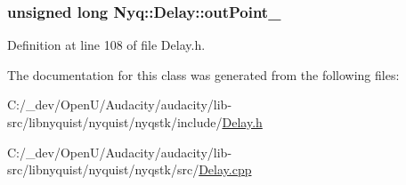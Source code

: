 \subsubsection[{\texorpdfstring{out\+Point\+\_\+}{outPoint_}}]{\setlength{\rightskip}{0pt plus 5cm}unsigned long Nyq\+::\+Delay\+::out\+Point\+\_\+\hspace{0.3cm}{\ttfamily [protected]}}\hypertarget{class_nyq_1_1_delay_a978ec66eae70e6da71854411421fe857}{}\label{class_nyq_1_1_delay_a978ec66eae70e6da71854411421fe857}


Definition at line 108 of file Delay.\+h.



The documentation for this class was generated from the following files\+:\begin{DoxyCompactItemize}
\item 
C\+:/\+\_\+dev/\+Open\+U/\+Audacity/audacity/lib-\/src/libnyquist/nyquist/nyqstk/include/\hyperlink{_delay_8h}{Delay.\+h}\item 
C\+:/\+\_\+dev/\+Open\+U/\+Audacity/audacity/lib-\/src/libnyquist/nyquist/nyqstk/src/\hyperlink{_delay_8cpp}{Delay.\+cpp}\end{DoxyCompactItemize}
